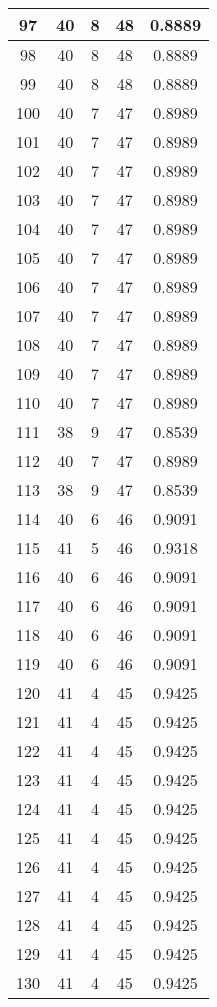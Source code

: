 \documentclass[letterpaper, 12pt]{article}
\begin{document}
\begin{longtable}{|c|c|c|c|c|}
\hline
97 & 40 & 8 & 48 & 0.8889 \\
\hline
98 & 40 & 8 & 48 & 0.8889 \\
\hline
99 & 40 & 8 & 48 & 0.8889 \\
\hline
100 & 40 & 7 & 47 & 0.8989 \\
\hline
101 & 40 & 7 & 47 & 0.8989 \\
\hline
102 & 40 & 7 & 47 & 0.8989 \\
\hline
103 & 40 & 7 & 47 & 0.8989 \\
\hline
104 & 40 & 7 & 47 & 0.8989 \\
\hline
105 & 40 & 7 & 47 & 0.8989 \\
\hline
106 & 40 & 7 & 47 & 0.8989 \\
\hline
107 & 40 & 7 & 47 & 0.8989 \\
\hline
108 & 40 & 7 & 47 & 0.8989 \\
\hline
109 & 40 & 7 & 47 & 0.8989 \\
\hline
110 & 40 & 7 & 47 & 0.8989 \\
\hline
111 & 38 & 9 & 47 & 0.8539 \\
\hline
112 & 40 & 7 & 47 & 0.8989 \\
\hline
113 & 38 & 9 & 47 & 0.8539 \\
\hline
114 & 40 & 6 & 46 & 0.9091 \\
\hline
115 & 41 & 5 & 46 & 0.9318 \\
\hline
116 & 40 & 6 & 46 & 0.9091 \\
\hline
117 & 40 & 6 & 46 & 0.9091 \\
\hline
118 & 40 & 6 & 46 & 0.9091 \\
\hline
119 & 40 & 6 & 46 & 0.9091 \\
\hline
120 & 41 & 4 & 45 & 0.9425 \\
\hline
121 & 41 & 4 & 45 & 0.9425 \\
\hline
122 & 41 & 4 & 45 & 0.9425 \\
\hline
123 & 41 & 4 & 45 & 0.9425 \\
\hline
124 & 41 & 4 & 45 & 0.9425 \\
\hline
125 & 41 & 4 & 45 & 0.9425 \\
\hline
126 & 41 & 4 & 45 & 0.9425 \\
\hline
127 & 41 & 4 & 45 & 0.9425 \\
\hline
128 & 41 & 4 & 45 & 0.9425 \\
\hline
129 & 41 & 4 & 45 & 0.9425 \\
\hline
130 & 41 & 4 & 45 & 0.9425 \\

\end{longtable}
\end{document}
